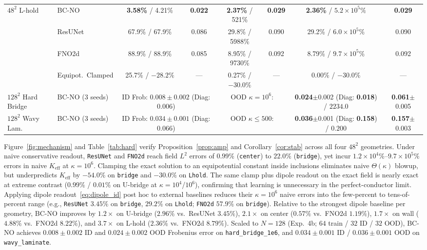 \documentclass[preprint,11pt]{elsarticle}
\newcommand{\Keff}{K_{\mathrm{eff}}}
\begin{document}
\begin{table}[t]
{\begin{tabular}{@{}llcccccc@{}}
\multirow{4}{*}{$48^2$ L-hold}
 & BC-NO & \textbf{3.58\%} / 4.21\% & \textbf{0.022} & \textbf{2.37\%} / 521\% & \textbf{0.029} & \textbf{2.36\%} / $5.2\times 10^5\%$ & \textbf{0.029} \\
 & ResUNet & 67.9\% / 67.9\% & 0.086 & 29.8\% / 5988\% & 0.090 & 29.2\% / $6.0\times 10^5\%$ & 0.090 \\
 & FNO2d & 88.9\% / 88.9\% & 0.085 & 8.95\% / 9730\% & 0.092 & 8.79\% / $9.7\times 10^5\%$ & 0.092 \\
 & Equipot.\ Clamped & 25.7\% / $-28.2\%$ & --- & 0.27\% / $-30.0\%$ & --- & 0.00\% / $-30.0\%$ & --- \\
\midrule
$128^2$ Hard Bridge & BC-NO (3 seeds) & \multicolumn{2}{c}{ID Frob: $0.008\pm 0.002$ (Diag: $0.006$)} & \multicolumn{2}{c}{OOD $\kappa=10^6$:} & \textbf{0.024}$\pm$0.002 (Diag: \textbf{0.018}) / $2234.0$ & \textbf{0.061}$\pm$0.005 \\
$128^2$ Wavy Lam. & BC-NO (3 seeds) & \multicolumn{2}{c}{ID Frob: $0.034\pm 0.001$ (Diag: $0.066$)} & \multicolumn{2}{c}{OOD $\kappa\le 500$:} & \textbf{0.036}$\pm$0.001 (Diag: \textbf{0.158}) / $0.200$ & \textbf{0.157}$\pm$0.003 \\
\bottomrule
\end{tabular}}
\end{table}

Figure~\ref{fig:mechanism} and Table~\ref{tab:hard} verify Proposition~\ref{prop:amp} and Corollary~\ref{cor:stab} across all four $48^2$ geometries. Under naive conservative readout, \texttt{ResUNet} and \texttt{FNO2d} reach field $L^2$ errors of $0.99\%$ (\texttt{center}) to $22.0\%$ (\texttt{bridge}), yet incur $1.2\times 10^4\%$--$9.7\times 10^5\%$ errors in naive $\Keff$ at $\kappa=10^6$. Clamping the exact solution to an equipotential constant inside inclusions eliminates naive $\Theta(\kappa)$ blowup, but underpredicts $\Keff$ by $-54.0\%$ on \texttt{bridge} and $-30.0\%$ on \texttt{Lhold}. The same clamp plus dipole readout on the exact field is nearly exact at extreme contrast ($0.99\%$ / $0.01\%$ on U-bridge at $\kappa=10^4$/$10^6$), confirming that learning is unnecessary in the perfect-conductor limit. Applying dipole readout~\eqref{eq:dipole_id} post hoc to external baselines reduces their $\kappa=10^6$ naive errors into the few-percent to tens-of-percent range (e.g., \texttt{ResUNet} $3.45\%$ on \texttt{bridge}, $29.2\%$ on \texttt{Lhold}; \texttt{FNO2d} $57.9\%$ on \texttt{bridge}). Relative to the strongest dipole baseline per geometry, BC-NO improves by $1.2\times$ on U-bridge ($2.96\%$ vs.\ ResUNet $3.45\%$), $2.1\times$ on center ($0.57\%$ vs.\ FNO2d $1.19\%$), $1.7\times$ on wall ($4.88\%$ vs.\ FNO2d $8.22\%$), and $3.7\times$ on L-hold ($2.36\%$ vs.\ FNO2d $8.79\%$). Scaled to $N=128$ (Exp.~4b; $64$ train / $32$ ID / $32$ OOD), BC-NO achieves $0.008\pm 0.002$ ID and $0.024\pm 0.002$ OOD Frobenius error on \texttt{hard\_bridge\_1e6}, and $0.034\pm 0.001$ ID / $0.036\pm 0.001$ OOD on \texttt{wavy\_laminate}.
\end{document}
